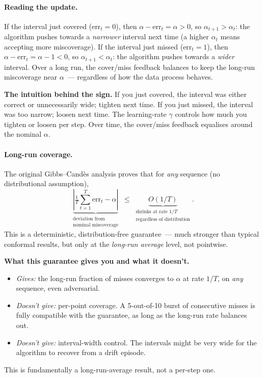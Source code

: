 \documentclass[letterpaper,11pt,leqno]{article}
\begin{document}
\paragraph{Reading the update.} If the interval just covered ($\text{err}_t = 0$), then $\alpha - \text{err}_t = \alpha > 0$, so $\alpha_{t+1} > \alpha_t$: the algorithm pushes towards a \emph{narrower} interval next time (a higher $\alpha_t$ means accepting more miscoverage). If the interval just missed ($\text{err}_t = 1$), then $\alpha - \text{err}_t = \alpha - 1 < 0$, so $\alpha_{t+1} < \alpha_t$: the algorithm pushes towards a \emph{wider} interval. Over a long run, the cover/miss feedback balances to keep the long-run miscoverage near $\alpha$~--- regardless of how the data process behaves.

\begin{explain}
\textbf{The intuition behind the sign.} If you just covered, the interval was either correct or unnecessarily wide; tighten next time. If you just missed, the interval was too narrow; loosen next time. The learning-rate $\gamma$ controls how much you tighten or loosen per step. Over time, the cover/miss feedback equalises around the nominal $\alpha$.
\end{explain}

\paragraph{Long-run coverage.} The original Gibbs--Cand\`es analysis \cite{gibbs2021aci} proves that for \emph{any} sequence (no distributional assumption),
\begin{equation*}
\underbrace{\left| \tfrac{1}{T} \sum_{t=1}^{T} \text{err}_t - \alpha \right|}_{\substack{\text{deviation from}\\\text{nominal miscoverage}}}
\;\leq\;
\underbrace{O(1/T)}_{\substack{\text{shrinks at rate } 1/T\\\text{regardless of distribution}}}.
\end{equation*}
This is a deterministic, distribution-free guarantee~--- much stronger than typical conformal results, but only at the \emph{long-run average} level, not pointwise.

\begin{theoremexplain}
\textbf{What this guarantee gives you and what it doesn't.}
\begin{itemize}
\item \emph{Gives:} the long-run fraction of misses converges to $\alpha$ at rate $1/T$, on \emph{any} sequence, even adversarial.
\item \emph{Doesn't give:} per-point coverage. A 5-out-of-10 burst of consecutive misses is fully compatible with the guarantee, as long as the long-run rate balances out.
\item \emph{Doesn't give:} interval-width control. The intervals might be very wide for the algorithm to recover from a drift episode.
\end{itemize}
This is fundamentally a long-run-average result, not a per-step one.
\end{theoremexplain}
\end{document}
